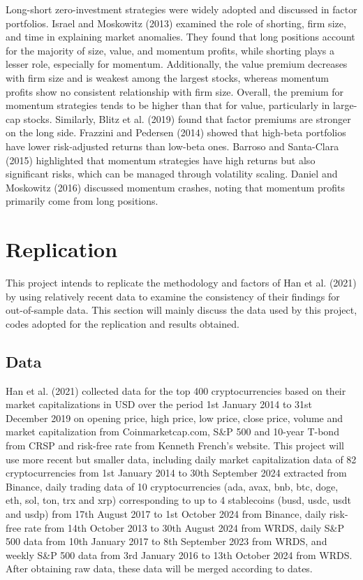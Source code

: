 \documentclass{article}
\begin{document}
Long-short zero-investment strategies were widely adopted and discussed in factor portfolios. Israel and Moskowitz (2013) examined the role of shorting, firm size, and time in explaining market anomalies. They found that long positions account for the majority of size, value, and momentum profits, while shorting plays a lesser role, especially for momentum. Additionally, the value premium decreases with firm size and is weakest among the largest stocks, whereas momentum profits show no consistent relationship with firm size. Overall, the premium for momentum strategies tends to be higher than that for value, particularly in large-cap stocks. Similarly, Blitz et al. (2019) found that factor premiums are stronger on the long side. Frazzini and Pedersen (2014) showed that high-beta portfolios have lower risk-adjusted returns than low-beta ones. Barroso and Santa-Clara (2015) highlighted that momentum strategies have high returns but also significant risks, which can be managed through volatility scaling. Daniel and Moskowitz (2016) discussed momentum crashes, noting that momentum profits primarily come from long positions.

\hypertarget{replication}{%
\section{Replication}\label{replication}}

This project intends to replicate the methodology and factors of Han et al. (2021) by using relatively recent data to examine the consistency of their findings for out-of-sample data. This section will mainly discuss the data used by this project, codes adopted for the replication and results obtained.


\hypertarget{data}{%
\subsection{Data}\label{data}}

Han et al. (2021) collected data for the top 400 cryptocurrencies based on their market capitalizations in USD over the period 1st January 2014 to 31st December 2019 on opening price, high price, low price, close price, volume and market capitalization from Coinmarketcap.com, S\&P 500 and 10-year T-bond from CRSP and risk-free rate from Kenneth French’s website. This project will use more recent but smaller data, including daily market capitalization data of 82 cryptocurrencies from 1st January 2014 to 30th September 2024 extracted from Binance, daily trading data of 10 cryptocurrencies (ada,  avax, bnb,  btc,  doge, eth, sol, ton, trx and xrp) corresponding to up to 4 stablecoins (busd, usdc, usdt and usdp) from 17th August 2017 to 1st October 2024 from Binance, daily risk-free rate from 14th October 2013 to 30th August 2024 from WRDS, daily S\&P 500 data from 10th January 2017 to 8th September 2023 from WRDS, and weekly S\&P 500 data from 3rd January 2016 to 13th October 2024 from WRDS. After obtaining raw data, these data will be merged according to dates.
\end{document}
